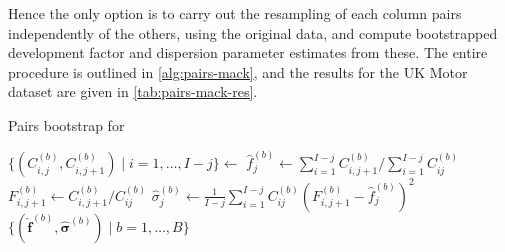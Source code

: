 \documentclass[a4paper]{book}
\begin{document}
Hence the only option is to carry out the resampling of each column pairs independently of the others, using the original data, and compute bootstrapped development factor and dispersion parameter estimates from these. The entire procedure is outlined in \cref{alg:pairs-mack}, and the results for the UK Motor dataset are given in \cref{tab:pairs-mack-res}.

\begin{algorithm}[!htb]
  \caption{Pairs bootstrap for }
  \label{alg:pairs-mack}
  \begin{algorithmic}
        \vspace{5pt}
        \State $\{ (C^{(b)}_{i, j}, C^{(b)}_{i, j + 1}) \mid i = 1, \dots, I - j \} \gets$ 
        \vspace{5pt}
        \State $\widehat{f}^{(b)}_j \gets \sum_{i = 1}^{I - j} C^{(b)}_{i, j + 1} / \sum_{i = 1}^{I - j} C^{(b)}_{ij}$
        \vspace{5pt}
          \State $\displaystyle F^{(b)}_{i, j + 1} \gets C^{(b)}_{i, j + 1} / C^{(b)}_{ij}$
          \vspace{5pt}
        \EndFor
        \State $\displaystyle \widehat{\sigma}^{(b)}_j \gets \frac{1}{I-j}\sum_{i = 1}^{I-j} C^{(b)}_{ij}\left( F^{(b)}_{i, j + 1} - \widehat{f}^{(b)}_j \right)^2$
      \EndFor
    \EndFor
    \State \Return $\{ (\widehat{\bm{f}}^{(b)}, \widehat{\bm{\sigma}}^{(b)}) \mid b = 1, \dots, B \}$
  \end{algorithmic}
\end{algorithm}
\end{document}
